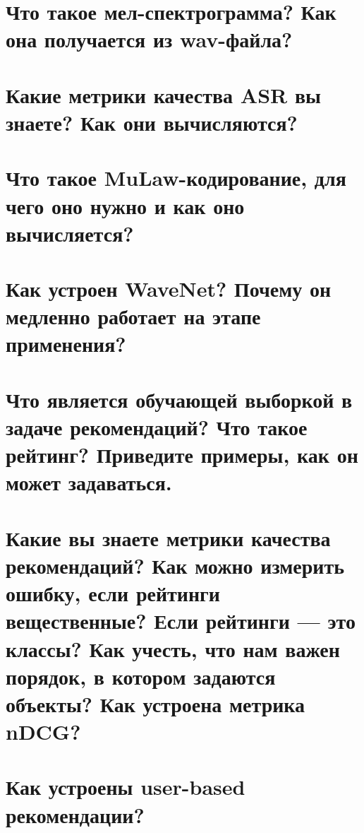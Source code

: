 \documentclass[14pt]{extarticle}
\begin{document}
	\section{Что такое мел-спектрограмма? Как она получается из wav-файла?} %
	
	
	\newpage
	
	\section{Какие метрики качества ASR вы знаете? Как они вычисляются?}
	
	
	\newpage
	
	\section{Что такое MuLaw-кодирование, для чего оно нужно и как оно вычисляется?}
	
	
	\newpage
	
	\section{Как устроен WaveNet? Почему он медленно работает на этапе применения?}
	
	
	\newpage
	
	\section{Что является обучающей выборкой в задаче рекомендаций? Что такое рейтинг? Приведите примеры, как он может задаваться.}
	
	
	\section{Какие вы знаете метрики качества рекомендаций? Как можно измерить ошибку, если рейтинги вещественные? Если рейтинги — это классы? Как учесть, что нам важен порядок, в котором задаются объекты? Как устроена метрика nDCG?} %
	
	
	\newpage
	
	\section{Как устроены user-based рекомендации?}  
	
	
	\newpage
	
\end{document}
